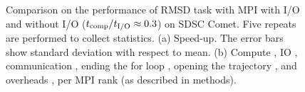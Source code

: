 \begin{figure}[ht!]
\caption{Comparison on the performance of RMSD task with MPI with I/O and without I/O (${t}_{\text{comp}}/{t}_{\text{I/O}} \approx 0.3$) on SDSC Comet.
Five repeats are performed to collect statistics. (a) Speed-up. The error bars show standard deviation with respect to mean.
(b) Compute \tcomp, IO \tIO, communication \tcomm, ending the for loop ,
  opening the trajectory , and overheads ,   per MPI rank (as described in methods).}
\label{fig:MPIwithoutIO}
\end{figure}

